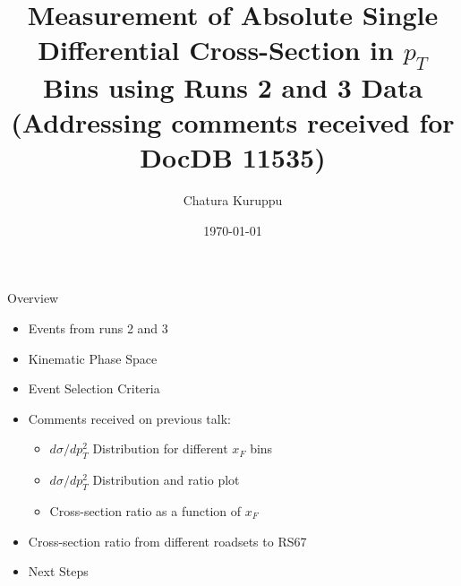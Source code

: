 \documentclass[aspectratio=169]{beamer}
\title{Measurement of Absolute Single Differential Cross-Section in $p_T$ Bins using Runs 2 and 3 Data\\ (Addressing comments received for DocDB 11535)}
\author{Chatura Kuruppu}
\institute{New Mexico State University\\ \vspace{0.1cm} SeaQuest Experiment (E906)}
\date{\today}
\begin{document}
\begin{frame}\titlepage\end{frame}
\begin{frame}{Overview}
\begin{itemize}
    \setlength{\itemsep}{0.5em}
    \item Events from runs 2 and 3
    \item Kinematic Phase Space
    \item Event Selection Criteria
    \item Comments received on previous talk:
    \begin{itemize} 
        \item $d\sigma/dp^{2}_T$ Distribution for different $x_F$ bins
        \item $d\sigma/dp^{2}_T$ Distribution and ratio plot
        \item Cross-section ratio as a function of $x_F$
    \end{itemize}
    \item Cross-section ratio from different roadsets to RS67
    \item Next Steps
\end{itemize}
\end{frame}
\end{document}
